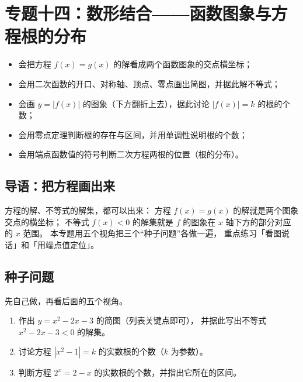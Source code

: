 \section{专题十四：数形结合——函数图象与方程根的分布}

\begin{learnobjective}
\begin{itemize}
  \item 会把方程 $f(x)=g(x)$ 的解看成两个函数图象的交点横坐标；
  \item 会用二次函数的开口、对称轴、顶点、零点画出简图，并据此解不等式；
  \item 会画 $y=|f(x)|$ 的图象（下方翻折上去），据此讨论 $|f(x)|=k$ 的根的个数；
  \item 会用零点定理判断根的存在与区间，并用单调性说明根的个数；
  \item 会用端点函数值的符号判断二次方程两根的位置（根的分布）。
\end{itemize}
\end{learnobjective}

\begin{preview}
\subsection{导语：把方程画出来}
方程的解、不等式的解集，都可以出来：
方程 $f(x)=g(x)$ 的解就是两个图象交点的横坐标；
不等式 $f(x)<0$ 的解集就是 $f$ 的图象在 $x$ 轴下方的部分对应的 $x$ 范围。
本专题用五个视角把三个“种子问题”各做一遍，
重点练习「看图说话」和「用端点值定位」。

\subsection{种子问题}
先自己做，再看后面的五个视角。
\begin{enumerate}
  \item 作出 $y=x^2-2x-3$ 的简图（列表关键点即可），
        并据此写出不等式 $x^2-2x-3<0$ 的解集。
  \item 讨论方程 $|x^2-1|=k$ 的实数根的个数（$k$ 为参数）。
  \item 判断方程 $2^x=2-x$ 的实数根的个数，并指出它所在的区间。
\end{enumerate}
\end{preview}

